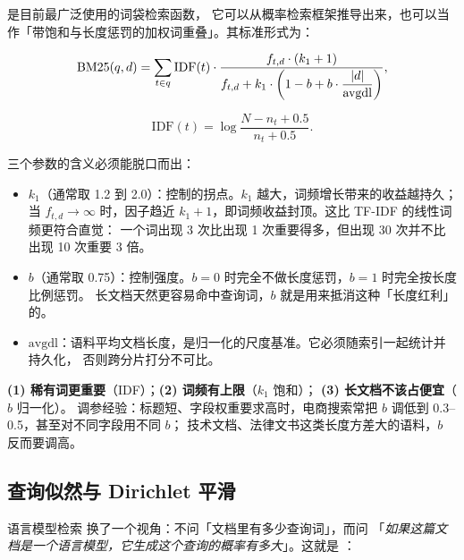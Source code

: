 \cite{robertson1994okapi,robertson2009bm25} 是目前最广泛使用的词袋检索函数，
它可以从概率检索框架推导出来，也可以当作「带饱和与长度惩罚的加权词重叠」。其标准形式为：

\begin{equation}
\text{BM25}(q, d) = \sum_{t \in q} \text{IDF}(t) \cdot
\frac{f_{t,d} \cdot (k_1 + 1)}{f_{t,d} + k_1 \cdot \left(1 - b + b \cdot \dfrac{\left\lvert d \right\rvert}{\text{avgdl}}\right)} ,
\label{eq:bm25}
\end{equation}

\begin{equation}
\text{IDF}(t) = \log \frac{N - n_t + 0.5}{n_t + 0.5} .
\label{eq:bm25idf}
\end{equation}

三个参数的含义必须能脱口而出：

\begin{itemize}
  \item $k_1$（通常取 1.2 到 2.0）：控制的拐点。$k_1$ 越大，词频增长带来的收益越持久；
        当 $f_{t,d} \to \infty$ 时，因子趋近 $k_1 + 1$，即词频收益封顶。这比 TF-IDF 的线性词频更符合直觉：
        一个词出现 3 次比出现 1 次重要得多，但出现 30 次并不比出现 10 次重要 3 倍。
  \item $b$（通常取 0.75）：控制强度。$b=0$ 时完全不做长度惩罚，$b=1$ 时完全按长度比例惩罚。
        长文档天然更容易命中查询词，$b$ 就是用来抵消这种「长度红利」的。
  \item $\text{avgdl}$：语料平均文档长度，是归一化的尺度基准。它必须随索引一起统计并持久化，
        否则跨分片打分不可比。
\end{itemize}

\begin{formulacard}[BM25 的三个直觉]
\textbf{(1) 稀有词更重要}（IDF）；\textbf{(2) 词频有上限}（$k_1$ 饱和）；
\textbf{(3) 长文档不该占便宜}（$b$ 归一化）。
调参经验：标题短、字段权重要求高时，电商搜索常把 $b$ 调低到 0.3--0.5，甚至对不同字段用不同 $b$；
技术文档、法律文书这类长度方差大的语料，$b$ 反而要调高。
\end{formulacard}

\subsection{查询似然与 Dirichlet 平滑}

语言模型检索\cite{ponte1998ql} 换了一个视角：不问「文档里有多少查询词」，而问
「\emph{如果这篇文档是一个语言模型，它生成这个查询的概率有多大}」。这就是 ：

